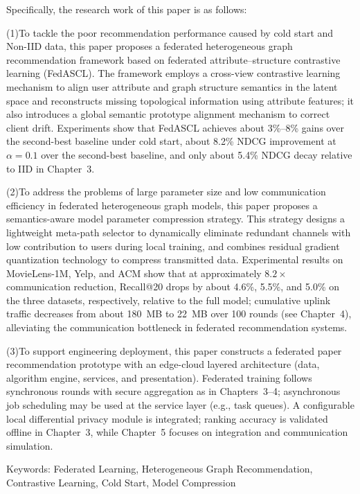 {\noindent Specifically, the research work of this paper is as follows:

\noindent (1)To tackle the poor recommendation performance caused by cold start and Non-IID data, this paper proposes a federated heterogeneous graph recommendation framework based on federated attribute--structure contrastive learning (FedASCL). The framework employs a cross-view contrastive learning mechanism to align user attribute and graph structure semantics in the latent space and reconstructs missing topological information using attribute features; it also introduces a global semantic prototype alignment mechanism to correct client drift. Experiments show that FedASCL achieves about 3\%--8\% gains over the second-best baseline under cold start, about 8.2\% NDCG improvement at $\alpha=0.1$ over the second-best baseline, and only about 5.4\% NDCG decay relative to IID in Chapter~3.

\noindent (2)To address the problems of large parameter size and low communication efficiency in federated heterogeneous graph models, this paper proposes a semantics-aware model parameter compression strategy. This strategy designs a lightweight meta-path selector to dynamically eliminate redundant channels with low contribution to users during local training, and combines residual gradient quantization technology to compress transmitted data. Experimental results on MovieLens-1M, Yelp, and ACM show that at approximately $8.2\times$ communication reduction, Recall@20 drops by about 4.6\%, 5.5\%, and 5.0\% on the three datasets, respectively, relative to the full model; cumulative uplink traffic decreases from about 180~MB to 22~MB over 100 rounds (see Chapter~4), alleviating the communication bottleneck in federated recommendation systems.

\noindent (3)To support engineering deployment, this paper constructs a federated paper recommendation prototype with an edge-cloud layered architecture (data, algorithm engine, services, and presentation). Federated training follows synchronous rounds with secure aggregation as in Chapters~3--4; asynchronous job scheduling may be used at the service layer (e.g., task queues). A configurable local differential privacy module is integrated; ranking accuracy is validated offline in Chapter~3, while Chapter~5 focuses on integration and communication simulation.
\par
}
\endgroup

\vspace{\AbstractBodyKeywordVSpace}
\begin{flushleft}
{\xiaosihao\rmfamily Keywords: }\xiaosihao\rmfamily Federated Learning, Heterogeneous Graph Recommendation, Contrastive Learning, Cold Start, Model Compression
\end{flushleft}
